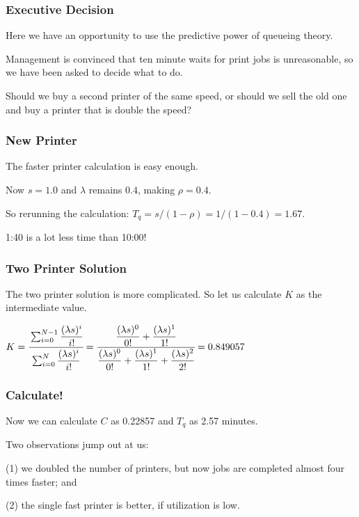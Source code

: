 \begin{frame}
\frametitle{Executive Decision}

Here we have an opportunity to use the predictive power of queueing theory. 

Management is convinced that ten minute waits for print jobs is unreasonable, so we have been asked to decide what to do. 

Should we buy a second printer of the same speed, or should we sell the old one and buy a printer that is double the speed?

\end{frame}



\begin{frame}
\frametitle{New Printer}

The faster printer calculation is easy enough. 

Now $s = 1.0$ and $\lambda$ remains $0.4$, making $\rho = 0.4$. 

So rerunning the calculation: $T_{q} = s / (1 - \rho ) = 1 / (1 - 0.4 ) = 1.67$.

1:40 is a lot less time than 10:00! 

\end{frame}



\begin{frame}
\frametitle{Two Printer Solution}

The two printer solution is more complicated. So let us calculate $K$ as the intermediate value. 

\begin{center}
	$K = \cfrac{\sum_{i=0}^{N-1}\dfrac{(\lambda s)^{i}}{i!}}{{\sum_{i=0}^{N}\dfrac{(\lambda s)^{i}}{i!}}} = \cfrac{\dfrac{(\lambda s)^{0}}{0!} + \dfrac{(\lambda s)^{1}}{1!}}{\dfrac{(\lambda s)^{0}}{0!} + \dfrac{(\lambda s)^{1}}{1!} + \dfrac{(\lambda s)^{2}}{2!}} = 0.849057$
	
\end{center}

\end{frame}



\begin{frame}
\frametitle{Calculate!}

Now we can calculate $C$ as 0.22857 and $T_{q}$ as 2.57 minutes. 

Two observations jump out at us: 

(1) we doubled the number of printers, but now jobs are completed almost four times faster; and 

(2) the single fast printer is better, if utilization is low.

\end{frame}



